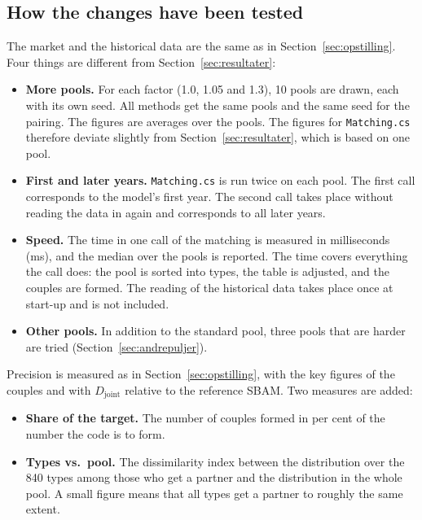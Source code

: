 \documentclass[12pt,a4paper]{article}
\newcommand{\kode}[1]{\texttt{#1}}
\begin{document}
\subsection{How the changes have been tested}

The market and the historical data are the same as in Section~\ref{sec:opstilling}. Four things are
different from Section~\ref{sec:resultater}:

\begin{itemize}
\item \textbf{More pools.} For each factor (1.0, 1.05 and 1.3), 10 pools are drawn, each with its
own seed. All methods get the same pools and the same seed for the pairing. The figures are
averages over the pools. The figures for \kode{Matching.cs} therefore deviate slightly from
Section~\ref{sec:resultater}, which is based on one pool.
\item \textbf{First and later years.} \kode{Matching.cs} is run twice on each pool. The first call
corresponds to the model's first year. The second call takes place without reading the data in
again and corresponds to all later years.
\item \textbf{Speed.} The time in one call of the matching is measured in milliseconds (ms), and
the median over the pools is reported. The time covers everything the call does: the pool is sorted
into types, the table is adjusted, and the couples are formed. The reading of the historical data
takes place once at start-up and is not included.
\item \textbf{Other pools.} In addition to the standard pool, three pools that are harder are tried
(Section~\ref{sec:andrepuljer}).
\end{itemize}

Precision is measured as in Section~\ref{sec:opstilling}, with the key figures of the couples and
with $D_{\text{joint}}$ relative to the reference SBAM. Two measures are added:

\begin{itemize}
\item \textbf{Share of the target.} The number of couples formed in per cent of the number the code
is to form.
\item \textbf{Types vs.\ pool.} The dissimilarity index between the distribution over the 840 types
among those who get a partner and the distribution in the whole pool. A small figure means that all
types get a partner to roughly the same extent.
\end{itemize}
\end{document}
